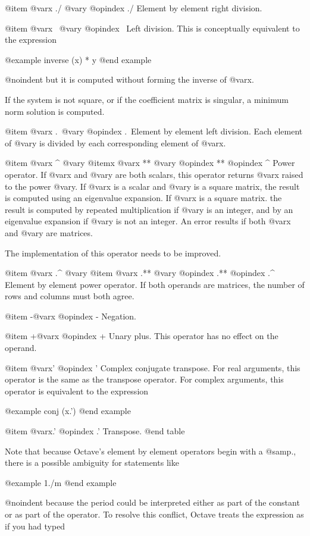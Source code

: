@item @var{x} ./ @var{y}
@opindex ./
Element by element right division.

@item @var{x} \ @var{y}
@opindex \
Left division.  This is conceptually equivalent to the expression

@example
inverse (x) * y
@end example

@noindent
but it is computed without forming the inverse of @var{x}.

If the system is not square, or if the coefficient matrix is singular,
a minimum norm solution is computed.

@item @var{x} .\ @var{y}
@opindex .\
Element by element left division.  Each element of @var{y} is divided
by each corresponding element of @var{x}.

@item @var{x} ^ @var{y}
@itemx @var{x} ** @var{y}
@opindex **
@opindex ^
Power operator.  If @var{x} and @var{y} are both scalars, this operator
returns @var{x} raised to the power @var{y}.  If @var{x} is a scalar and
@var{y} is a square matrix, the result is computed using an eigenvalue
expansion.  If @var{x} is a square matrix. the result is computed by
repeated multiplication if @var{y} is an integer, and by an eigenvalue
expansion if @var{y} is not an integer.  An error results if both
@var{x} and @var{y} are matrices.

The implementation of this operator needs to be improved.

@item @var{x} .^ @var{y}
@item @var{x} .** @var{y}
@opindex .**
@opindex .^
Element by element power operator.  If both operands are matrices, the
number of rows and columns must both agree.

@item -@var{x}
@opindex -
Negation.

@item +@var{x}
@opindex +
Unary plus.  This operator has no effect on the operand.

@item @var{x}'
@opindex '
Complex conjugate transpose.  For real arguments, this operator is the
same as the transpose operator.  For complex arguments, this operator is
equivalent to the expression

@example
conj (x.')
@end example

@item @var{x}.'
@opindex .'
Transpose.
@end table

Note that because Octave's element by element operators begin with a
@samp{.}, there is a possible ambiguity for statements like

@example
1./m
@end example

@noindent
because the period could be interpreted either as part of the constant
or as part of the operator.  To resolve this conflict, Octave treats the
expression as if you had typed

